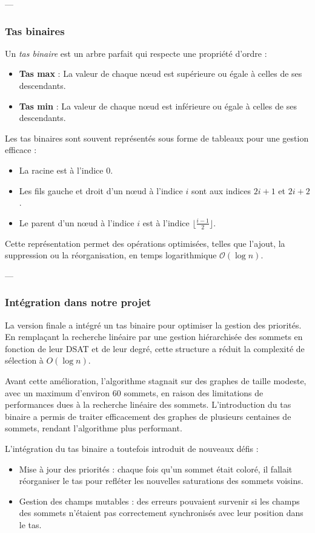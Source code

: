 \documentclass[11pt]{article}
\begin{document}
---

\subsubsection{Tas binaires}
Un \textit{tas binaire} est un arbre parfait qui respecte une propriété d’ordre : \cite {data_structure_complements}
\begin{itemize}
    \item \textbf{Tas max} : La valeur de chaque nœud est supérieure ou égale à celles de ses descendants.
    \item \textbf{Tas min} : La valeur de chaque nœud est inférieure ou égale à celles de ses descendants.
\end{itemize}

Les tas binaires sont souvent représentés sous forme de tableaux pour une gestion efficace :
\begin{itemize}
    \item La racine est à l'indice $0$.
    \item Les fils gauche et droit d’un nœud à l’indice $i$ sont aux indices $2i+1$ et $2i+2$.
    \item Le parent d’un nœud à l’indice $i$ est à l’indice $\lfloor \frac{i-1}{2} \rfloor$.
\end{itemize}

Cette représentation permet des opérations optimisées, telles que l'ajout, la suppression ou la réorganisation, en temps logarithmique $\mathcal{O}(\log n)$.

---

\subsubsection{Intégration dans notre projet}


La version finale a intégré un tas binaire pour optimiser la gestion des priorités. En remplaçant la recherche linéaire par une gestion hiérarchisée des sommets en fonction de leur DSAT et de leur degré, cette structure a réduit la complexité de sélection à \( O(\log n) \).

Avant cette amélioration, l’algorithme stagnait sur des graphes de taille modeste, avec un maximum d’environ 60 sommets, en raison des limitations de performances dues à la recherche linéaire des sommets. L’introduction du tas binaire a permis de traiter efficacement des graphes de plusieurs centaines de sommets, rendant l’algorithme plus performant.


L'intégration du tas binaire a toutefois introduit de nouveaux défis :
\begin{itemize}
    \item Mise à jour des priorités : chaque fois qu’un sommet était coloré, il fallait réorganiser le tas pour refléter les nouvelles saturations des sommets voisins.
    \item Gestion des champs mutables : des erreurs pouvaient survenir si les champs des sommets n’étaient pas correctement synchronisés avec leur position dans le tas.
\end{itemize}
\end{document}
